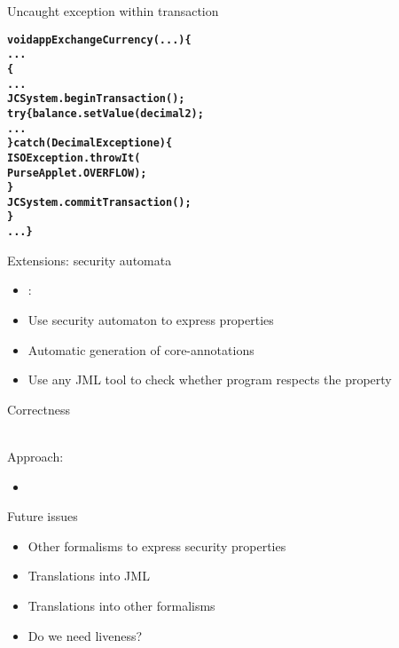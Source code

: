 \documentclass[final,nocolorBG,a4,marieke,nototal,pdf, accumulate,slideColor]{prosper}
\begin{document}
\begin{slide}{Uncaught exception within transaction}
\begin{alltt}
\textbf{void appExchangeCurrency(...) \{
   ...
    \{
      ...
      JCSystem.beginTransaction();	
      try \{balance.setValue(decimal2);
            ...
      \} catch (DecimalException e) \{
         ISOException.throwIt(
              PurseApplet.OVERFLOW);
      \}
      JCSystem.commitTransaction();
   \}
   ...\}}
\end{alltt}
\end{slide}


\begin{slide}{Extensions: security automata}
\begin{itemize}
\item {}: 
\item Use security automaton to express properties
\item Automatic generation of core-annotations
\item Use any JML tool to check whether program respects the property
\end{itemize}
\end{slide}

\begin{slide}{Correctness}
\begin{center}
\end{center}
\ \smallskip\\
Approach:
\begin{itemize}
\item \
\end{itemize}
\end{slide}


\begin{slide}{Future issues}
\begin{itemize}
\item Other formalisms to express security properties
\item Translations into JML
\item Translations into other formalisms
\item Do we need liveness?
\end{itemize}
\end{slide}
\end{document}
